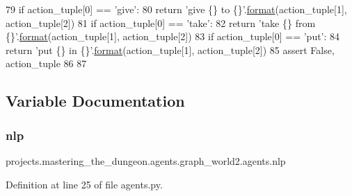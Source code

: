 \begin{DoxyCode}
79     \textcolor{keywordflow}{if} action\_tuple[0] == \textcolor{stringliteral}{'give'}:
80         \textcolor{keywordflow}{return} \textcolor{stringliteral}{'give \{\} to \{\}'}.\hyperlink{namespaceparlai_1_1chat__service_1_1services_1_1messenger_1_1shared__utils_a32e2e2022b824fbaf80c747160b52a76}{format}(action\_tuple[1], action\_tuple[2])
81     \textcolor{keywordflow}{if} action\_tuple[0] == \textcolor{stringliteral}{'take'}:
82         \textcolor{keywordflow}{return} \textcolor{stringliteral}{'take \{\} from \{\}'}.\hyperlink{namespaceparlai_1_1chat__service_1_1services_1_1messenger_1_1shared__utils_a32e2e2022b824fbaf80c747160b52a76}{format}(action\_tuple[1], action\_tuple[2])
83     \textcolor{keywordflow}{if} action\_tuple[0] == \textcolor{stringliteral}{'put'}:
84         \textcolor{keywordflow}{return} \textcolor{stringliteral}{'put \{\} in \{\}'}.\hyperlink{namespaceparlai_1_1chat__service_1_1services_1_1messenger_1_1shared__utils_a32e2e2022b824fbaf80c747160b52a76}{format}(action\_tuple[1], action\_tuple[2])
85     \textcolor{keyword}{assert} \textcolor{keyword}{False}, action\_tuple
86 
87 
\end{DoxyCode}


\subsection{Variable Documentation}
\mbox{\label{namespaceprojects_1_1mastering__the__dungeon_1_1agents_1_1graph__world2_1_1agents_a23f3d83753e09a5389a8154023d72b3f}} 
\subsubsection{\texorpdfstring{nlp}{nlp}}
{\footnotesize\ttfamily projects.\+mastering\+\_\+the\+\_\+dungeon.\+agents.\+graph\+\_\+world2.\+agents.\+nlp}



Definition at line 25 of file agents.\+py.

